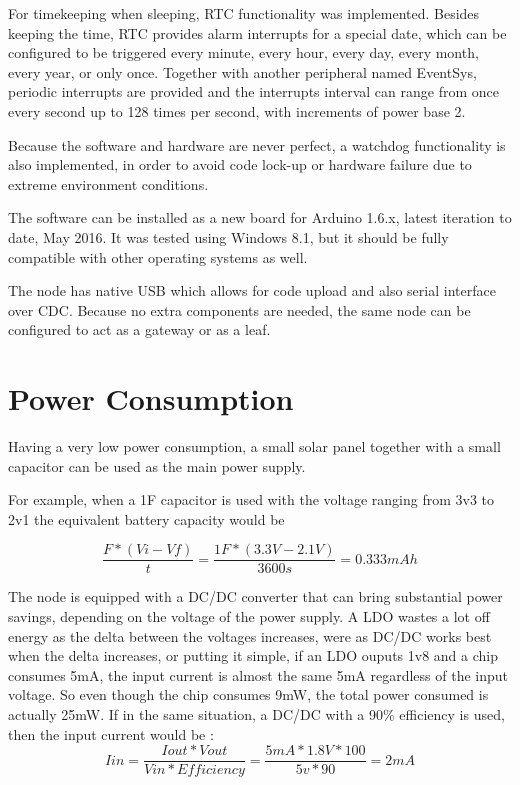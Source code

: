 For timekeeping when sleeping, RTC functionality was implemented. Besides keeping the time, RTC
provides alarm interrupts for a special date, which can be configured to be triggered every
minute, every hour, every day, every month, every year, or only once. Together with another
peripheral named EventSys, periodic interrupts are provided and the interrupts interval can range
from once every second up to 128 times per second, with increments of power base 2.

Because the software and hardware are never perfect, a watchdog functionality is also implemented,
in order to avoid code lock-up or hardware failure due to extreme environment conditions.

The software can be installed as a new board for Arduino 1.6.x, latest iteration to date,
May 2016. It was tested using Windows 8.1, but it should be fully compatible with other operating systems as well.

The node has native USB which allows for code upload and also serial interface over CDC. Because no
extra components are needed, the same node can be configured to act as a gateway or
as a leaf.

\label{chap:results}


\section{Power Consumption}

Having a very low power consumption, a small solar panel together with a
small capacitor can be used as the main power supply.

For example, when a 1F capacitor is used with the voltage ranging from 3v3 to 2v1 the equivalent battery capacity would be

$$ \frac{F * (Vi - Vf)}{t} = \frac{1F * (3.3V - 2.1V)}{3600s} = 0.333mAh$$

The node is equipped with a DC/DC converter that can bring substantial power savings, depending on
the voltage of the power supply. A LDO wastes a lot off energy as the delta between the
voltages increases, were as DC/DC works best when the delta increases, or putting it simple, if an
LDO ouputs 1v8 and a chip consumes 5mA, the input current is almost the same 5mA regardless of the
input voltage. So even though the chip consumes 9mW, the total power consumed is actually 25mW. If
in the same situation, a DC/DC with a 90\% efficiency is used, then the input current would be :
$$Iin = \frac{Iout * Vout}{Vin*Efficiency} = \frac{5mA * 1.8V*100}{5v*90}= 2mA$$


